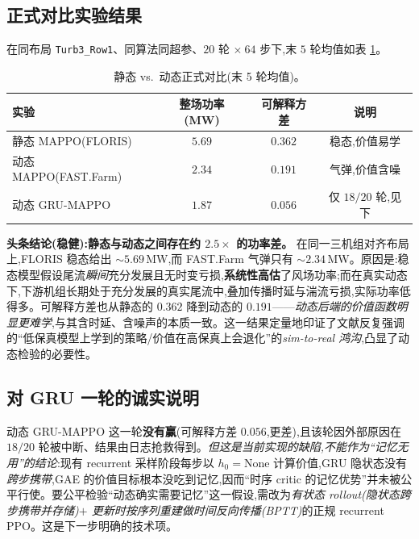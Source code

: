\documentclass[12pt,a4paper]{article}
\theoremstyle{definition}
\theoremstyle{plain}
\begin{document}
\subsection{正式对比实验结果}

在同布局 \texttt{Turb3\_Row1}、同算法同超参、$20$ 轮 $\times\ 64$ 步下,末 $5$ 轮均值如表 \ref{tab:result}。

\begin{table}[h]
\centering
\renewcommand{\arraystretch}{1.25}
\begin{tabular}{@{}lccc@{}}
\toprule
\textbf{实验} & \textbf{整场功率 (MW)} & \textbf{可解释方差} & \textbf{说明} \\
\midrule
静态 MAPPO(FLORIS)      & $\mathbf{5.69}$ & $0.362$ & 稳态,价值易学 \\
动态 MAPPO(FAST.Farm)   & $\mathbf{2.34}$ & $0.191$ & 气弹,价值含噪 \\
动态 GRU-MAPPO          & $1.87$          & $0.056$ & 仅 $18/20$ 轮,见下 \\
\bottomrule
\end{tabular}
\caption{静态 vs.\ 动态正式对比(末 5 轮均值)。}
\label{tab:result}
\end{table}

\textbf{头条结论(稳健):静态与动态之间存在约 $2.5\times$ 的功率差。} 在同一三机组对齐布局上,FLORIS 稳态给出 $\sim\!5.69$\,MW,而 FAST.Farm 气弹只有 $\sim\!2.34$\,MW。原因是:稳态模型假设尾流\emph{瞬间}充分发展且无时变亏损,\textbf{系统性高估}了风场功率;而在真实动态下,下游机组长期处于充分发展的真实尾流中,叠加传播时延与湍流亏损,实际功率低得多。可解释方差也从静态的 $0.362$ 降到动态的 $0.191$——\emph{动态后端的价值函数明显更难学},与其含时延、含噪声的本质一致。这一结果定量地印证了文献反复强调的“低保真模型上学到的策略/价值在高保真上会退化”的\emph{sim-to-real 鸿沟},凸显了动态检验的必要性。

\subsection{对 GRU 一轮的诚实说明}

动态 GRU-MAPPO 这一轮\textbf{没有赢}(可解释方差 $0.056$,更差),且该轮因外部原因在 $18/20$ 轮被中断、结果由日志抢救得到。\emph{但这是当前实现的缺陷,不能作为“记忆无用”的结论}:现有 recurrent 采样阶段每步以 $h_0=\text{None}$ 计算价值,GRU 隐状态没有\emph{跨步携带},GAE 的价值目标根本没吃到记忆,因而“时序 critic 的记忆优势”并未被公平行使。要公平检验“动态确实需要记忆”这一假设,需改为\emph{有状态 rollout(隐状态跨步携带并存储)$+$ 更新时按序列重建做时间反向传播(BPTT)}的正规 recurrent PPO。这是下一步明确的技术项。
\end{document}
